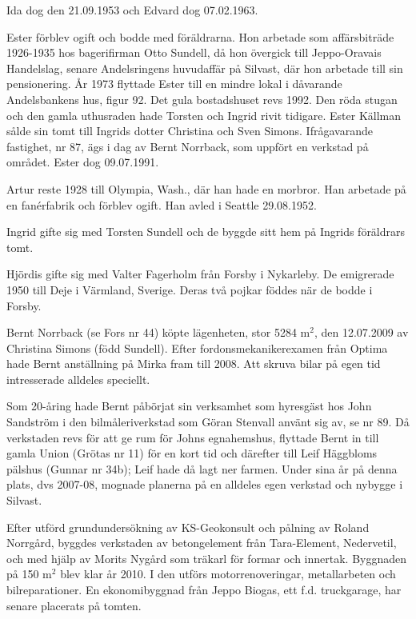 Ida dog den 21.09.1953 och Edvard dog 07.02.1963.

Ester förblev ogift och bodde med föräldrarna. Hon arbetade som affärsbiträde 1926-1935 hos bagerifirman Otto Sundell, då hon övergick till Jeppo-Oravais Handelslag, senare Andelsringens huvudaffär på 	Silvast, där hon arbetade till sin pensionering. År 1973 flyttade Ester till 	en mindre lokal i dåvarande Andelsbankens hus, figur 92. Det gula bostadshuset revs 1992. Den röda stugan och den gamla uthusraden hade 	Torsten och Ingrid rivit tidigare. Ester Källman sålde sin tomt till Ingrids dotter Christina och Sven Simons. Ifrågavarande fastighet, nr 87, ägs i dag av Bernt Norrback, som uppfört en verkstad på området. Ester dog 09.07.1991.

Artur reste 1928 till Olympia, Wash., där han hade en morbror. Han 	arbetade på en fanérfabrik och förblev ogift. Han avled i Seattle 	29.08.1952.

Ingrid gifte sig med Torsten Sundell och de byggde sitt hem på Ingrids föräldrars tomt.

Hjördis gifte sig med Valter Fagerholm från Forsby i Nykarleby. De 	emigrerade 1950 till Deje i Värmland, Sverige. Deras två pojkar föddes när de bodde i Forsby.






Bernt Norrback (se Fors nr 44) köpte lägenheten, stor 5284 m$^2$, den 12.07.2009  av Christina Simons (född Sundell). Efter fordonsmekanikerexamen från Optima hade Bernt anställning på Mirka fram till 2008. Att skruva bilar på egen tid intresserade alldeles speciellt.

Som 20-åring hade Bernt påbörjat sin verksamhet som hyresgäst	hos John Sandström i den bilmåleriverkstad som Göran Stenvall använt sig av, se nr 89. Då verkstaden revs för att ge rum för Johns egnahemshus, flyttade Bernt in till gamla Union (Grötas nr 11) för en kort tid och därefter till Leif Häggbloms pälshus (Gunnar nr 34b); Leif hade då lagt ner farmen. Under sina år på denna plats, dvs 2007-08, mognade	planerna på en alldeles egen verkstad och nybygge i Silvast.

Efter utförd grundundersökning av KS-Geokonsult och pålning av Roland Norrgård, byggdes verkstaden av betongelement från Tara-Element, Nedervetil, och med hjälp av Morits Nygård som träkarl för formar och innertak. Byggnaden på 150 m$^2$ blev klar år 2010. I den utförs	motorrenoveringar, metallarbeten och bilreparationer. En ekonomibyggnad från Jeppo Biogas, ett f.d. truckgarage, har senare placerats på tomten.



